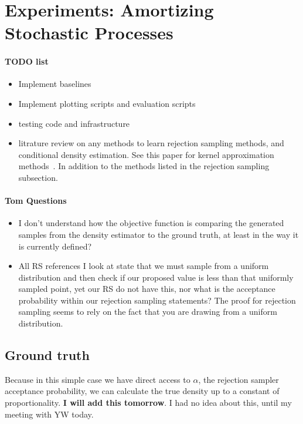 \documentclass{article}
\begin{document}
\section{Experiments: Amortizing Stochastic Processes}

\paragraph{TODO list}
\begin{itemize}
  \item Implement baselines
  \item Implement plotting scripts and evaluation scripts
  \item testing code and infrastructure
  \item litrature review on any methods to learn rejection sampling methods, 
  and conditional density estimation. See this paper for kernel approximation 
  methods~\cite{erraqabi2016pliable}. In addition to the methods listed in the 
  rejection sampling subsection. 
\end{itemize}

\paragraph{Tom Questions}

\begin{itemize}
  \item I don't understand how the objective function is comparing the generated samples from the density 
  estimator to the ground truth, at least in the way it is currently defined? 
  \item All RS references I look at state that we must sample from a uniform distribution and
  then check if our proposed value is less than that uniformly sampled point, yet our RS do not have this,
  nor what is the acceptance probability within our rejection sampling statements? The proof for rejection sampling seems to rely on the fact that you are drawing from a uniform distribution.  

  \end{itemize}
\subsection{Ground truth}

Because in this simple case we have direct access to $\alpha$, the rejection sampler acceptance probability,
we can calculate the true density up to a constant of proportionality. 
\textbf{I will add this tomorrow}. I had no idea about this, until my meeting with 
YW today. 
\end{document}

